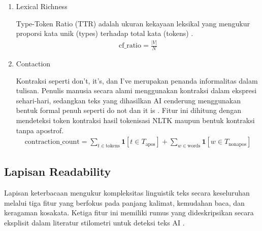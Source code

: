 \begin{enumerate}[label=\arabic*., leftmargin=*]
  \item Lexical Richness
  
  Type-Token Ratio (TTR) adalah ukuran kekayaan leksikal yang mengukur proporsi kata unik (types) terhadap total kata (tokens) \cite{Tschuggnall2015}\cite{Gunawan2021}.
  \begin{equation}
  \label{eq:19}
  \begin{split}
  \mathrm{cf}\_\mathrm{ratio}=\frac{\left|V\right|}{N}
  \end{split}
  \end{equation}

  \item Contaction
  
  Kontraksi seperti don’t, it’s, dan I’ve merupakan penanda informalitas dalam tulisan. Penulis manusia secara alami menggunakan kontraksi dalam ekspresi sehari-hari, sedangkan teks yang dihasilkan AI cenderung menggunakan bentuk formal penuh seperti do not dan it is \cite{Analysis}. Fitur ini dihitung dengan mendeteksi token kontraksi hasil tokenisasi NLTK maupun bentuk kontraksi tanpa apostrof.
  \begin{equation}
  \label{eq:20}
  \begin{split}
  \text{contraction\_count} = \sum_{t \in \text{tokens}} \mathbf{1}\left[t \in T_{\text{apos}}\right] + \sum_{w \in \text{words}} \mathbf{1}\left[w \in T_{\text{nonapos}}\right]
  \end{split}
  \end{equation}
  
\end{enumerate}

\subsection{Lapisan Readability}

Lapisan keterbacaan mengukur kompleksitas linguistik teks secara keseluruhan melalui tiga fitur yang berfokus pada panjang kalimat, kemudahan baca, dan keragaman kosakata. Ketiga fitur ini memiliki rumus yang dideskripsikan secara eksplisit dalam literatur stilometri untuk deteksi teks AI \cite{Analysis}\cite{Tschuggnall2015}.

